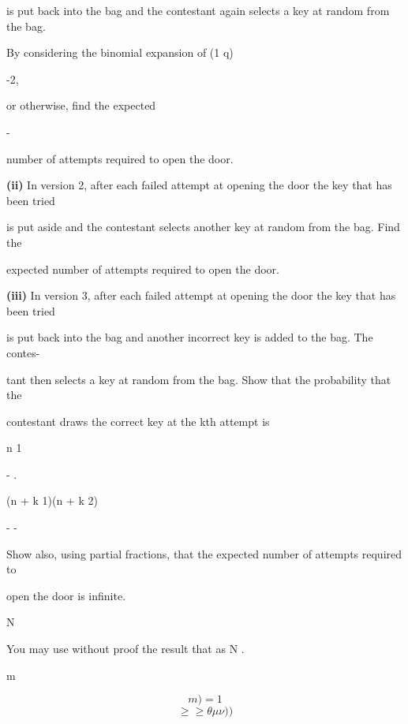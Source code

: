 \documentclass[12pt]{article}
\begin{document}
\begin{flushleft}
is put back into the bag and the contestant again selects a key at random from the bag.\par
By considering the binomial expansion of (1 q)\par
-2,\par
or otherwise, find the expected\par
-\par
number of attempts required to open the door.\par
\textbf{(ii)} In version 2, after each failed attempt at opening the door the key that has been tried\par
is put aside and the contestant selects another key at random from the bag. Find the\par
expected number of attempts required to open the door.\par
\textbf{(iii)} In version 3, after each failed attempt at opening the door the key that has been tried\par
is put back into the bag and another incorrect key is added to the bag. The contes-\par
tant then selects a key at random from the bag. Show that the probability that the\par
contestant draws the correct key at the kth attempt is\par
n 1\par
- .\par
(n + k 1)(n + k 2)\par
- -\par
Show also, using partial fractions, that the expected number of attempts required to\par
open the door is infinite.\par
N\par
You may use without proof the result that as N .\par
m \to \infty \to \infty\par
\[m)=1\]
\[\geq\geq\theta\mu\nu) )\]
\end{flushleft}
\end{document}
